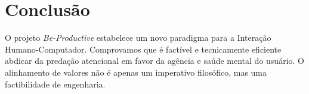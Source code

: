 \documentclass{sbc2023}
\begin{document}
\section{Conclusão}
O projeto \textit{Be-Productive} estabelece um novo paradigma para a Interação Humano-Computador. Comprovamos que é factível e tecnicamente eficiente abdicar da predação atencional em favor da agência e saúde mental do usuário. O alinhamento de valores não é apenas um imperativo filosófico, mas uma factibilidade de engenharia.



\end{document}
